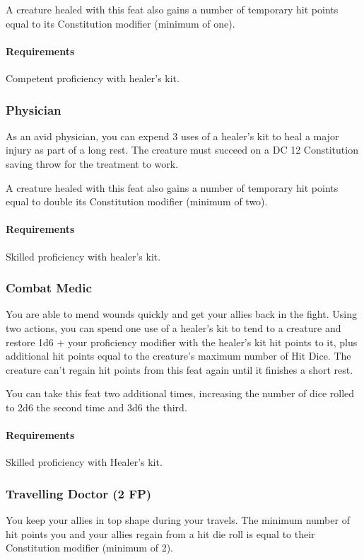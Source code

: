     A creature healed with this feat also gains a number of temporary hit points equal to its Constitution modifier (minimum of one).
    \paragraph{Requirements} Competent proficiency with healer's kit.
\subsubsection{Physician} \label{feat::physician}
    As an avid physician, you can expend 3 uses of a healer's kit to heal a major injury as part of a long rest.
    The creature must succeed on a DC 12 Constitution saving throw for the treatment to work.

    A creature healed with this feat also gains a number of temporary hit points equal to double its Constitution modifier (minimum of two).
    \paragraph{Requirements} Skilled proficiency with healer's kit.
\subsubsection{Combat Medic} \label{feat::combatmedic}
    You are able to mend wounds quickly and get your allies back in the fight.
    Using two actions, you can spend one use of a healer's kit to tend to a creature and restore 1d6 + your proficiency modifier with the healer's kit hit points to it, plus additional hit points equal to the creature's maximum number of Hit Dice.
    The creature can't regain hit points from this feat again until it finishes a short rest.

    You can take this feat two additional times, increasing the number of dice rolled to 2d6 the second time and 3d6 the third.
    \paragraph{Requirements} Skilled proficiency with Healer's kit.
\subsubsection{Travelling Doctor (2 FP)} \label{feat::travellingdoctor}
    You keep your allies in top shape during your travels.
    The minimum number of hit points you and your allies regain from a hit die roll is equal to their Constitution modifier (minimum of 2).
